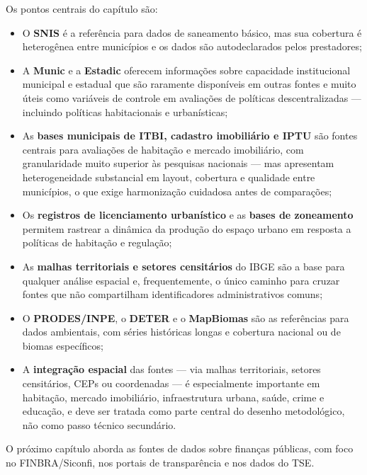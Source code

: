 Os pontos centrais do capítulo são:

\begin{itemize}
  \item O \textbf{SNIS} é a referência para dados de saneamento básico, mas sua cobertura é heterogênea entre municípios e os dados são autodeclarados pelos prestadores;

  \item A \textbf{Munic} e a \textbf{Estadic} oferecem informações sobre capacidade institucional municipal e estadual que são raramente disponíveis em outras fontes e muito úteis como variáveis de controle em avaliações de políticas descentralizadas --- incluindo políticas habitacionais e urbanísticas;

  \item As \textbf{bases municipais de ITBI, cadastro imobiliário e IPTU} são fontes centrais para avaliações de habitação e mercado imobiliário, com granularidade muito superior às pesquisas nacionais --- mas apresentam heterogeneidade substancial em layout, cobertura e qualidade entre municípios, o que exige harmonização cuidadosa antes de comparações;

  \item Os \textbf{registros de licenciamento urbanístico} e as \textbf{bases de zoneamento} permitem rastrear a dinâmica da produção do espaço urbano em resposta a políticas de habitação e regulação;

  \item As \textbf{malhas territoriais e setores censitários} do IBGE são a base para qualquer análise espacial e, frequentemente, o único caminho para cruzar fontes que não compartilham identificadores administrativos comuns;

  \item O \textbf{PRODES/INPE}, o \textbf{DETER} e o \textbf{MapBiomas} são as referências para dados ambientais, com séries históricas longas e cobertura nacional ou de biomas específicos;

  \item A \textbf{integração espacial} das fontes --- via malhas territoriais, setores censitários, CEPs ou coordenadas --- é especialmente importante em habitação, mercado imobiliário, infraestrutura urbana, saúde, crime e educação, e deve ser tratada como parte central do desenho metodológico, não como passo técnico secundário.
\end{itemize}

O próximo capítulo aborda as fontes de dados sobre finanças públicas, com foco no FINBRA/Siconfi, nos portais de transparência e nos dados do TSE.
